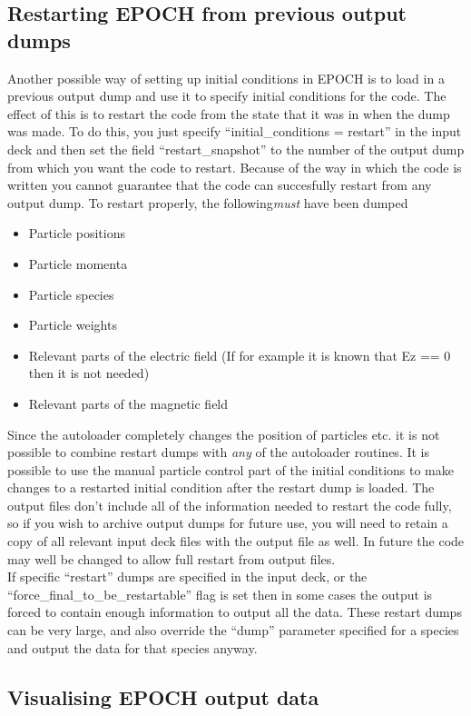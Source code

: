 \documentclass[12pt]{article}
\begin{document}
\subsection{Restarting EPOCH from previous output dumps}
Another possible way of setting up initial conditions in EPOCH is to load in a previous output dump and use it to specify initial conditions for the code. The effect of this is to restart the code from the state that it was in when the dump was made. To do this, you just specify ``initial\_conditions = restart'' in the input deck and then set the field ``restart\_snapshot'' to the number of the output dump from which you want the code to restart. Because of the way in which the code is written you cannot guarantee that the code can succesfully restart from any output dump. To restart properly, the following{\it must} have been dumped
\begin{itemize}
\item Particle positions
\item Particle momenta
\item Particle species
\item Particle weights
\item Relevant parts of the electric field (If for example it is known that Ez == 0 then it is not needed)
\item Relevant parts of the magnetic field
\end{itemize}
Since the autoloader completely changes the position of particles etc. it is not possible to combine restart dumps with {\it any} of the autoloader routines. It is possible to use the manual particle control part of the initial conditions to make changes to a restarted initial condition after the restart dump is loaded. The output files don't include all of the information needed to restart the code fully, so if you wish to archive output dumps for future use, you will need to retain a copy of all relevant input deck files with the output file as well. In future the code may well be changed to allow full restart from output files.\\

If specific ``restart'' dumps are specified in the input deck, or the ``force\_final\_to\_be\_restartable'' flag is set then in some cases the output is forced to contain enough information to output all the data. These restart dumps can be very large, and also override the ``dump'' parameter specified for a species and output the data for that species anyway.
\subsection{Visualising EPOCH output data}
\end{document}
